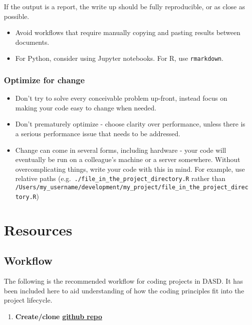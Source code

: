 \documentclass[]{book}
\providecommand{\tightlist}{%
  \setlength{\itemsep}{0pt}\setlength{\parskip}{0pt}}
\begin{document}
If the output is a report, the write up should be fully reproducible, or as close as possible.

\begin{itemize}
\tightlist
\item
  Avoid workflows that require manually copying and pasting results between documents.\\
\item
  For Python, consider using Jupyter notebooks. For R, use \texttt{rmarkdown}.
\end{itemize}

\hypertarget{change}{%
\section{Optimize for change}\label{change}}

\begin{itemize}
\tightlist
\item
  Don't try to solve every conceivable problem up-front, instead focus on making your code easy to change when needed.
\item
  Don't prematurely optimize - choose clarity over performance, unless there is a serious performance issue that needs to be addressed.
\item
  Change can come in several forms, including hardware - your code will eventually be run on a colleague's machine or a server somewhere. Without overcomplicating things, write your code with this in mind. For example, use relative paths (e.g.~\texttt{./file\_in\_the\_project\_directory.R} rather than \texttt{/Users/my\_username/development/my\_project/file\_in\_the\_project\_directory.R})
\end{itemize}

\hypertarget{resources}{%
\part{Resources}\label{resources}}

\hypertarget{wf}{%
\chapter{Workflow}\label{wf}}

The following is the recommended workflow for coding projects in DASD. It has been included here to aid understanding of how the coding principles fit into the project lifecycle.

\begin{enumerate}
\def\labelenumi{\arabic{enumi}.}
\tightlist
\item
  \textbf{Create/clone \protect\hyperlink{versioncontrol}{github repo}}\\
\end{enumerate}
\end{document}
